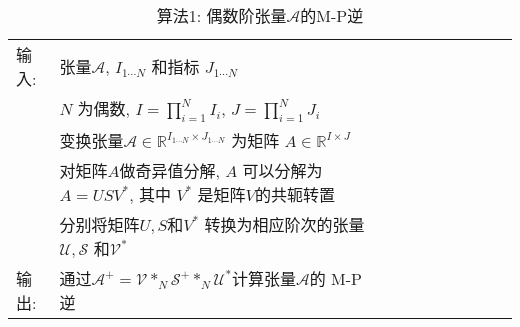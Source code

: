 \begin{table} [!ht]
\caption{算法1: 偶数阶张量$\mathcal A$的M-P逆 \cite{HuangZhao2019-9577}}
\label{T2RVFL3:alg1}
\vspace{-0.5cm}
\begin{center}
\begin{tabular} {p{1.05cm}p{9.25cm}llcccccc}
\hline
输入:& 张量$\mathcal A$, $I_{1 \cdots N} $ 和指标 $J_{1 \cdots N} $\\
&$N$ 为偶数, $I=\prod_{i=1} ^N I_i$, $J=\prod_{i=1} ^N J_i$\\
&变换张量$\mathcal A\in \mathbb R^{I_{1 \cdots N} \times J_{1 \cdots N} } $ 为矩阵 $A\in \mathbb R^{I\times J} $\\
&对矩阵$A$做奇异值分解, $A$ 可以分解为 $A=U S V^*$, 其中 $V^*$ 是矩阵$V$的共轭转置\\
&分别将矩阵$U, S$和$V^*$ 转换为相应阶次的张量$\mathcal U, \mathcal S$ 和$\mathcal V^*$\\
输出:& 通过$\mathcal A^+ = \mathcal V *_N\mathcal S^+ *_N \mathcal U^*$计算张量$\mathcal A$的 M-P逆\\
\hline
\end{tabular}
\end{center}
\end{table}
